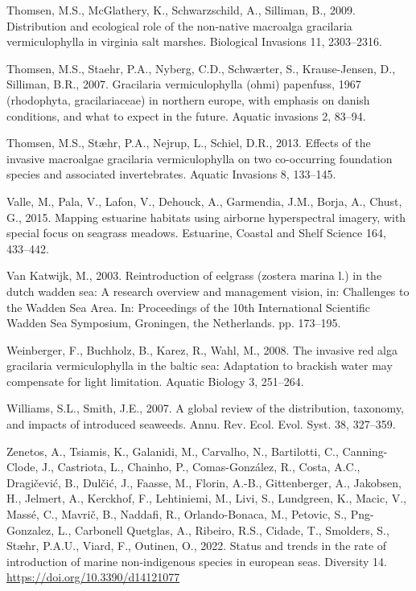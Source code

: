 \documentclass[
  letterpaper,
  DIV=11,
  numbers=noendperiod]{scrartcl}
\newlength{\cslhangindent}
\newenvironment{CSLReferences}[2] %
 {\begin{list}{}{%
  \setlength{\itemindent}{0pt}
  \setlength{\leftmargin}{0pt}
  \setlength{\parsep}{0pt}
  \ifodd #1
   \setlength{\leftmargin}{\cslhangindent}
   \setlength{\itemindent}{-1\cslhangindent}
  \fi
  \setlength{\itemsep}{#2\baselineskip}}}
 {\end{list}}
\begin{document}
\begin{CSLReferences}{1}{0}
Thomsen, M.S., McGlathery, K., Schwarzschild, A., Silliman, B., 2009.
Distribution and ecological role of the non-native macroalga gracilaria
vermiculophylla in virginia salt marshes. Biological Invasions 11,
2303--2316.

Thomsen, M.S., Staehr, P.A., Nyberg, C.D., Schwærter, S., Krause-Jensen,
D., Silliman, B.R., 2007. Gracilaria vermiculophylla (ohmi) papenfuss,
1967 (rhodophyta, gracilariaceae) in northern europe, with emphasis on
danish conditions, and what to expect in the future. Aquatic invasions
2, 83--94.

Thomsen, M.S., Stæhr, P.A., Nejrup, L., Schiel, D.R., 2013. Effects of
the invasive macroalgae gracilaria vermiculophylla on two co-occurring
foundation species and associated invertebrates. Aquatic Invasions 8,
133--145.

Valle, M., Pala, V., Lafon, V., Dehouck, A., Garmendia, J.M., Borja, A.,
Chust, G., 2015. Mapping estuarine habitats using airborne hyperspectral
imagery, with special focus on seagrass meadows. Estuarine, Coastal and
Shelf Science 164, 433--442.

Van Katwijk, M., 2003. Reintroduction of eelgrass (zostera marina l.) in
the dutch wadden sea: A research overview and management vision, in:
Challenges to the Wadden Sea Area. In: Proceedings of the 10th
International Scientific Wadden Sea Symposium, Groningen, the
Netherlands. pp. 173--195.

Weinberger, F., Buchholz, B., Karez, R., Wahl, M., 2008. The invasive
red alga gracilaria vermiculophylla in the baltic sea: Adaptation to
brackish water may compensate for light limitation. Aquatic Biology 3,
251--264.

Williams, S.L., Smith, J.E., 2007. A global review of the distribution,
taxonomy, and impacts of introduced seaweeds. Annu. Rev. Ecol. Evol.
Syst. 38, 327--359.

Zenetos, A., Tsiamis, K., Galanidi, M., Carvalho, N., Bartilotti, C.,
Canning-Clode, J., Castriota, L., Chainho, P., Comas-González, R.,
Costa, A.C., Dragičević, B., Dulčić, J., Faasse, M., Florin, A.-B.,
Gittenberger, A., Jakobsen, H., Jelmert, A., Kerckhof, F., Lehtiniemi,
M., Livi, S., Lundgreen, K., Macic, V., Massé, C., Mavrič, B., Naddafi,
R., Orlando-Bonaca, M., Petovic, S., Png-Gonzalez, L., Carbonell
Quetglas, A., Ribeiro, R.S., Cidade, T., Smolders, S., Stæhr, P.A.U.,
Viard, F., Outinen, O., 2022. Status and trends in the rate of
introduction of marine non-indigenous species in european seas.
Diversity 14. \url{https://doi.org/10.3390/d14121077}


\end{CSLReferences}
\end{document}
